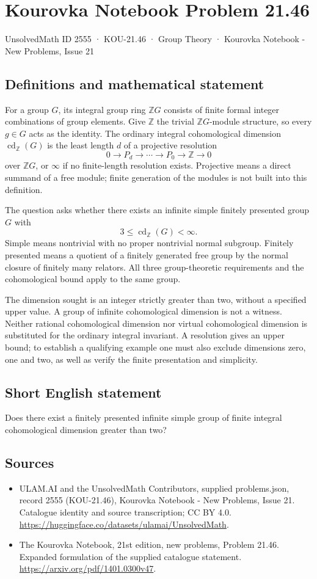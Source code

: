 \documentclass[11pt,a4paper]{article}
\begin{document}
\section*{Kourovka Notebook Problem 21.46}\label{2555}
{\small UnsolvedMath ID 2555 · KOU-21.46 · Group Theory · Kourovka Notebook - New Problems, Issue 21}
\subsection{Definitions and mathematical statement}
For a group $G$, its integral group ring $\mathbb ZG$ consists of
finite formal integer combinations of group elements. Give $\mathbb Z$
the trivial $\mathbb ZG$-module structure, so every $g\in G$ acts as
the identity. The ordinary integral cohomological dimension
$\operatorname{cd}_{\mathbb Z}(G)$ is the least length $d$ of a projective
resolution
\[
 0\longrightarrow P_d\longrightarrow\cdots\longrightarrow P_0
          \longrightarrow\mathbb Z\longrightarrow0
\]
over $\mathbb ZG$, or $\infty$ if no finite-length resolution exists.
Projective means a direct summand of a free module; finite generation
of the modules is not built into this definition.

The question asks whether there exists an infinite simple finitely
presented group $G$ with
\[
 3\le\operatorname{cd}_{\mathbb Z}(G)<\infty.
\]
Simple means nontrivial with no proper nontrivial normal subgroup.
Finitely presented means a quotient of a finitely generated free group
by the normal closure of finitely many relators. All three group-theoretic
requirements and the cohomological bound apply to the same group.

The dimension sought is an integer strictly greater than two, without
a specified upper value. A group of infinite cohomological dimension
is not a witness. Neither rational cohomological dimension nor virtual
cohomological dimension is substituted for the ordinary integral
invariant. A resolution gives an upper bound; to establish a qualifying
example one must also exclude dimensions zero, one and two, as well
as verify the finite presentation and simplicity.
\subsection{Short English statement}
Does there exist a finitely presented infinite simple group of finite integral cohomological dimension greater than two?
\subsection{Sources}
\begin{itemize}
\item[S1] ULAM.AI and the UnsolvedMath Contributors, supplied problems.json, record 2555 (KOU-21.46), Kourovka Notebook - New Problems, Issue 21. Catalogue identity and source transcription; CC BY 4.0.
\url{https://huggingface.co/datasets/ulamai/UnsolvedMath}.
\item[S2] The Kourovka Notebook, 21st edition, new problems, Problem 21.46. Expanded formulation of the supplied catalogue statement.
\url{https://arxiv.org/pdf/1401.0300v47}.
\end{itemize}
\end{document}
